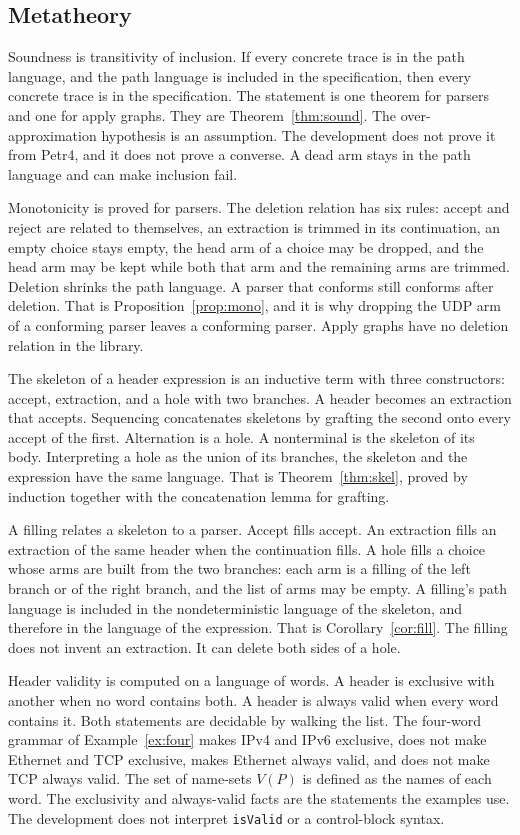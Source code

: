 \documentclass[a4paper,UKenglish,cleveref,autoref]{lipics-v2021}
\begin{document}
\subsection{Metatheory}

Soundness is transitivity of inclusion.
If every concrete trace is in the path language, and the path language is included in the specification, then every concrete trace is in the specification.
The statement is one theorem for parsers and one for apply graphs.
They are Theorem~\ref{thm:sound}.
The over-approximation hypothesis is an assumption.
The development does not prove it from Petr4, and it does not prove a converse.
A dead arm stays in the path language and can make inclusion fail.

Monotonicity is proved for parsers.
The deletion relation has six rules: accept and reject are related to themselves, an extraction is trimmed in its continuation, an empty choice stays empty, the head arm of a choice may be dropped, and the head arm may be kept while both that arm and the remaining arms are trimmed.
Deletion shrinks the path language.
A parser that conforms still conforms after deletion.
That is Proposition~\ref{prop:mono}, and it is why dropping the UDP arm of a conforming parser leaves a conforming parser.
Apply graphs have no deletion relation in the library.

The skeleton of a header expression is an inductive term with three constructors: accept, extraction, and a hole with two branches.
A header becomes an extraction that accepts.
Sequencing concatenates skeletons by grafting the second onto every accept of the first.
Alternation is a hole.
A nonterminal is the skeleton of its body.
Interpreting a hole as the union of its branches, the skeleton and the expression have the same language.
That is Theorem~\ref{thm:skel}, proved by induction together with the concatenation lemma for grafting.

A filling relates a skeleton to a parser.
Accept fills accept.
An extraction fills an extraction of the same header when the continuation fills.
A hole fills a choice whose arms are built from the two branches: each arm is a filling of the left branch or of the right branch, and the list of arms may be empty.
A filling's path language is included in the nondeterministic language of the skeleton, and therefore in the language of the expression.
That is Corollary~\ref{cor:fill}.
The filling does not invent an extraction.
It can delete both sides of a hole.

Header validity is computed on a language of words.
A header is exclusive with another when no word contains both.
A header is always valid when every word contains it.
Both statements are decidable by walking the list.
The four-word grammar of Example~\ref{ex:four} makes IPv4 and IPv6 exclusive, does not make Ethernet and TCP exclusive, makes Ethernet always valid, and does not make TCP always valid.
The set of name-sets \(V(P)\) is defined as the names of each word.
The exclusivity and always-valid facts are the statements the examples use.
The development does not interpret \texttt{isValid} or a control-block syntax.
\end{document}
